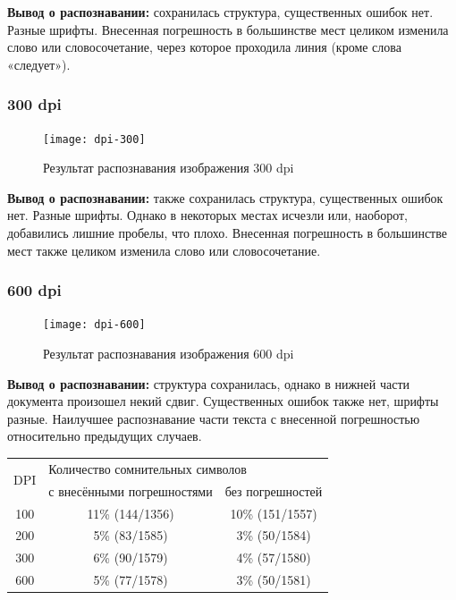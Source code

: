 		\textbf{Вывод о распознавании:} сохранилась структура, существенных ошибок нет. Разные шрифты. Внесенная погрешность в большинстве мест целиком изменила слово или словосочетание, через которое проходила линия (кроме слова «следует»).

		\subsubsection{300 dpi}
		\begin{figure}[h]
			\centering
			\texttt{[image: dpi-300]}
			\caption{Результат распознавания изображения 300 dpi}
			\label{fig:dpi-75}
		\end{figure}
		
		\textbf{Вывод о распознавании:} также сохранилась структура, существенных ошибок нет. Разные шрифты. Однако в некоторых местах исчезли или, наоборот, добавились лишние пробелы, что плохо. Внесенная погрешность в большинстве мест также целиком изменила слово или словосочетание.
		
		\newpage
		\subsubsection{600 dpi}
		\begin{figure}[h]
			\centering
			\texttt{[image: dpi-600]}
			\caption{Результат распознавания изображения 600 dpi}
			\label{fig:dpi-75}
		\end{figure}
		
		\textbf{Вывод о распознавании:} структура сохранилась, однако в нижней части документа произошел некий сдвиг. Существенных ошибок также нет, шрифты разные. Наилучшее распознавание части текста с внесенной  погрешностью относительно предыдущих случаев.
		
		\begin{tabular}{|c|c|c|}
			\hline
			\multirow{2}{*}{DPI} & \multicolumn{2}{l|}{Количество сомнительных символов} \\ \cline{2-3} 
			& с внесёнными погрешностями & без погрешностей \\ \hline
			100	&     11\% (144/1356)      &   10\% (151/1557)        \\ \hline
			200 &     5\% (83/1585)      &     3\% (50/1584)      \\ \hline
			300 &      6\% (90/1579)     &     4\% (57/1580)      \\ \hline
			600 &     5\% (77/1578)      &     3\% (50/1581)      \\ \hline
		\end{tabular}
	
